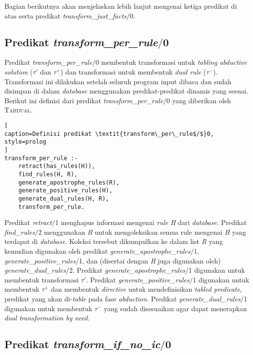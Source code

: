 Bagian berikutnya akan menjelaskan lebih lanjut mengenai ketiga predikat di atas serta predikat \textit{transform\_just\_facts$/$}0.

\subsection{Predikat \textit{transform\_per\_rule$/$}0}

Predikat \textit{transform\_per\_rule$/$}0 membentuk transformasi untuk \textit{tabling abductive solution} ($\tau'$ dan $\tau^+$) dan transformasi untuk membentuk \textit{dual rule} ($\tau^-$). Transformasi ini dilakukan setelah seluruh program input dibaca dan sudah disimpan di dalam \textit{database} menggunakan predikat-predikat dinamis yang sesuai. Berikut ini definisi dari predikat \textit{transform\_per\_rule$/$}0 yang diberikan oleh \textsc{Tabdual}.
\\

\begin{lstlisting}[
caption=Definisi predikat \textit{transform\_per\_rule$/$}0,
style=prolog
]
transform_per_rule :-
	retract(has_rules(H)),
	find_rules(H, R),
	generate_apostrophe_rules(R),
	generate_positive_rules(H),
	generate_dual_rules(H, R),
	transform_per_rule.
\end{lstlisting}

Predikat \textit{retract$/$}1 menghapus informasi mengenai \textit{rule H} dari \textit{database}. Predikat \textit{find\_rules$/$}2 menggunakan \textit{H} untuk mengoleksikan semua rule mengenai \textit{H} yang terdapat di \textit{database}. Koleksi tersebut dikumpulkan ke dalam list \textit{R} yang kemudian digunakan oleh predikat \textit{generate\_apostrophe\_rules$/$}1, \textit{generate\_positive\_rules$/$}1, dan (disertai dengan \textit{H} juga digunakan oleh) \textit{generate\_dual\_rules$/$}2. Predikat \textit{generate\_apostrophe\_rules$/$}1 digunakan untuk membentuk transformasi $\tau'$. Predikat \textit{generate\_positive\_rules$/$}1 digunakan untuk membentuk $\tau^+$ dan membentuk \textit{directive} untuk mendefinisikan \textit{tabled predicate}, predikat yang akan di-\textit{table} pada fase \textit{abduction}. Predikat \textit{generate\_dual\_rules$/$}1 digunakan untuk membentuk $\tau^-$ yang sudah disesuaikan agar dapat menerapkan \textit{dual transformation by need}.

\subsection{Predikat \textit{transform\_if\_no\_ic$/$}0}

